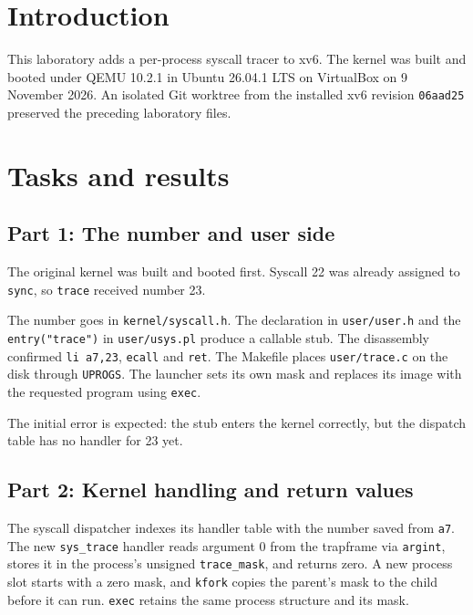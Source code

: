 \chapter{Introduction}
This laboratory adds a per-process syscall tracer to xv6. The kernel was built and booted under QEMU 10.2.1 in Ubuntu 26.04.1 LTS on VirtualBox on 9 November 2026. An isolated Git worktree from the installed xv6 revision \texttt{06aad25} preserved the preceding laboratory files.

\chapter{Tasks and results}
\section{Part 1: The number and user side}
The original kernel was built and booted first. Syscall 22 was already assigned to \texttt{sync}, so \texttt{trace} received number 23.

The number goes in \texttt{kernel/syscall.h}. The declaration in \texttt{user/user.h} and the \texttt{entry("trace")} in \texttt{user/usys.pl} produce a callable stub. The disassembly confirmed \texttt{li a7,23}, \texttt{ecall} and \texttt{ret}. The Makefile places \texttt{user/trace.c} on the disk through \texttt{UPROGS}. The launcher sets its own mask and replaces its image with the requested program using \texttt{exec}.

The initial error is expected: the stub enters the kernel correctly, but the dispatch table has no handler for 23 yet.

\clearpage
\section{Part 2: Kernel handling and return values}
The syscall dispatcher indexes its handler table with the number saved from \texttt{a7}. The new \texttt{sys\_trace} handler reads argument 0 from the trapframe via \texttt{argint}, stores it in the process's unsigned \texttt{trace\_mask}, and returns zero. A new process slot starts with a zero mask, and \texttt{kfork} copies the parent's mask to the child before it can run. \texttt{exec} retains the same process structure and its mask.

